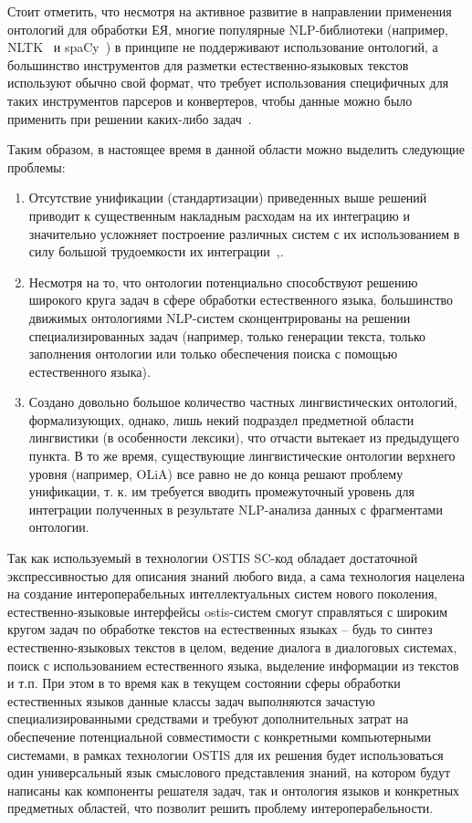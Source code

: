 Стоит отметить, что несмотря на активное развитие в направлении применения онтологий для обработки ЕЯ, многие популярные NLP-библиотеки (например, NLTK~\cite{nltk} и spaCy~\cite{spacy}) в принципе не поддерживают использование онтологий, а большинство инструментов для разметки естественно-языковых текстов используют обычно свой формат, что требует использования специфичных для таких инструментов парсеров и конвертеров, чтобы данные можно было применить при решении каких-либо задач~\cite[p.~3]{Erekhinskaya2020TenWO}.

Таким образом, в настоящее время в данной области можно выделить следующие проблемы:
\begin{enumerate}
    \item Отсутствие унификации (стандартизации) приведенных выше решений приводит к существенным накладным расходам на их интеграцию и значительно усложняет построение различных систем с их использованием в силу большой трудоемкости их интеграции~\cite{Standart2021},\cite{GolenkovProblems2021}.
    \item Несмотря на то, что онтологии потенциально способствуют решению широкого круга задач в сфере обработки естественного языка, большинство движимых онтологиями NLP-систем сконцентрированы на решении специализированных задач (например, только генерации текста, только заполнения онтологии или только обеспечения поиска с помощью естественного языка).
    \item Создано довольно большое количество частных лингвистических онтологий, формализующих, однако, лишь некий подраздел предметной области лингвистики (в особенности лексики), что отчасти вытекает из предыдущего пункта.
    В то же время, существующие лингвистические онтологии верхнего уровня (например, OLiA) все равно не до конца решают проблему унификации, т. к. им требуется вводить промежуточный уровень для интеграции полученных в результате NLP-анализа данных с фрагментами онтологии.
\end{enumerate}

Так как используемый в технологии OSTIS SC-код обладает достаточной экспрессивностью для описания знаний любого вида, а сама технология нацелена на создание интероперабельных интеллектуальных систем нового поколения, естественно-языковые интерфейсы ostis-систем смогут справляться с широким кругом задач по обработке текстов на естественных языках -- будь то синтез естественно-языковых текстов в целом, ведение диалога в диалоговых системах, поиск с использованием естественного языка, выделение информации из текстов и т.п. При этом в то время как в текущем состоянии сферы обработки естественных языков данные классы задач выполняются зачастую специализированными средствами и требуют дополнительных затрат на обеспечение потенциальной совместимости с конкретными компьютерными системами, в рамках технологии OSTIS для их решения будет использоваться один универсальный язык смыслового представления знаний, на котором будут написаны как компоненты решателя задач, так и онтология языков и конкретных предметных областей, что позволит решить проблему интероперабельности.

